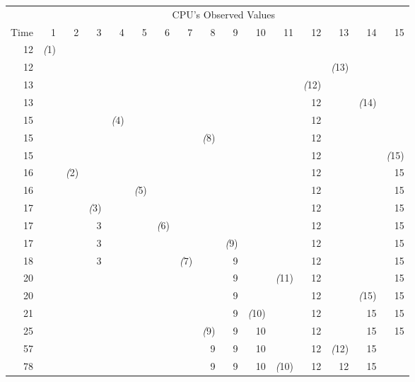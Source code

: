 \begin{table}[htbp]
\scriptsize
\centering
\begin{tabular}{r||r|r|r|r|r|r|r|r|r|r|r|r|r|r|r}
     & \multicolumn{15}{c}{CPU's Observed Values} \\
     \cline{2-16}
Time & 1 & 2 & 3 & 4 & 5 & 6 & 7 & 8 & 9 & 10 & 11 & 12 & 13 & 14 & 15 \\
\hline
\hline
12  & \emph(1) &  &  &  &  &  &  &  &  &  &  &  &  &  &  \\
\hline
12  & ~ &  &  &  &  &  &  &  &  &  &  &  & \emph(13) &  &  \\
\hline
13  & ~ &  &  &  &  &  &  &  &  &  &  & \emph(12) & ~ &  &  \\
\hline
13  & ~ &  &  &  &  &  &  &  &  &  &  & 12 & ~ & \emph(14) &  \\
\hline
15  & ~ &  &  & \emph(4) &  &  &  &  &  &  &  & 12 & ~ & ~ &  \\
\hline
15  & ~ &  &  & ~ &  &  &  & \emph(8) &  &  &  & 12 & ~ & ~ &  \\
\hline
15  & ~ &  &  & ~ &  &  &  & ~ &  &  &  & 12 & ~ & ~ & \emph(15) \\
\hline
16  & ~ & \emph(2) &  & ~ &  &  &  & ~ &  &  &  & 12 & ~ & ~ & 15 \\
\hline
16  & ~ & ~ &  & ~ & \emph(5) &  &  & ~ &  &  &  & 12 & ~ & ~ & 15 \\
\hline
17  & ~ & ~ & \emph(3) & ~ & ~ &  &  & ~ &  &  &  & 12 & ~ & ~ & 15 \\
\hline
17  & ~ & ~ & 3 & ~ & ~ & \emph(6) &  & ~ &  &  &  & 12 & ~ & ~ & 15 \\
\hline
17  & ~ & ~ & 3 & ~ & ~ & ~ &  & ~ & \emph(9) &  &  & 12 & ~ & ~ & 15 \\
\hline
18  & ~ & ~ & 3 & ~ & ~ & ~ & \emph(7) & ~ & 9 &  &  & 12 & ~ & ~ & 15 \\
\hline
20  & ~ & ~ & ~ & ~ & ~ & ~ & ~ & ~ & 9 &  & \emph(11) & 12 & ~ & ~ & 15 \\
\hline
20  & ~ & ~ & ~ & ~ & ~ & ~ & ~ & ~ & 9 &  & ~ & 12 & ~ & \emph(15) & 15 \\
\hline
21  & ~ & ~ & ~ & ~ & ~ & ~ & ~ & ~ & 9 & \emph(10) & ~ & 12 & ~ & 15 & 15 \\
\hline
25  & ~ & ~ & ~ & ~ & ~ & ~ & ~ & \emph(9) & 9 & 10 & ~ & 12 & ~ & 15 & 15 \\
\hline
57  & ~ & ~ & ~ & ~ & ~ & ~ & ~ & 9 & 9 & 10 & ~ & 12 & \emph(12) & 15 & ~ \\
\hline
78  & ~ & ~ & ~ & ~ & ~ & ~ & ~ & 9 & 9 & 10 & \emph(10) & 12 & 12 & 15 & ~ \\

\end{tabular}
\end{table}
